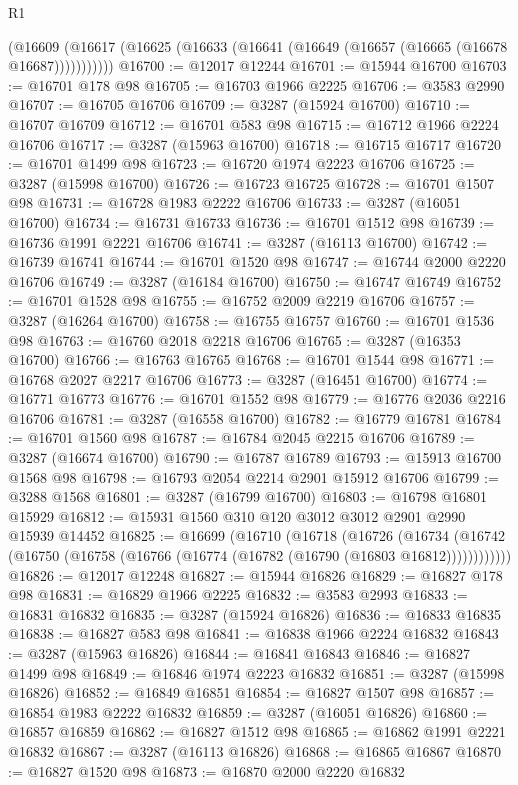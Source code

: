 \begin{lexlean}{R1}
\begin{coremodule}
        (@16609 (@16617 (@16625 (@16633 (@16641 (@16649 (@16657 (@16665 (@16678 @16687)))))))))))
@16700 := @12017 @12244
@16701 := @15944 @16700
@16703 := @16701 @178 @98
@16705 := @16703 @1966 @2225
@16706 := @3583 @2990
@16707 := @16705 @16706
@16709 := @3287 (@15924 @16700)
@16710 := @16707 @16709
@16712 := @16701 @583 @98
@16715 := @16712 @1966 @2224 @16706
@16717 := @3287 (@15963 @16700)
@16718 := @16715 @16717
@16720 := @16701 @1499 @98
@16723 := @16720 @1974 @2223 @16706
@16725 := @3287 (@15998 @16700)
@16726 := @16723 @16725
@16728 := @16701 @1507 @98
@16731 := @16728 @1983 @2222 @16706
@16733 := @3287 (@16051 @16700)
@16734 := @16731 @16733
@16736 := @16701 @1512 @98
@16739 := @16736 @1991 @2221 @16706
@16741 := @3287 (@16113 @16700)
@16742 := @16739 @16741
@16744 := @16701 @1520 @98
@16747 := @16744 @2000 @2220 @16706
@16749 := @3287 (@16184 @16700)
@16750 := @16747 @16749
@16752 := @16701 @1528 @98
@16755 := @16752 @2009 @2219 @16706
@16757 := @3287 (@16264 @16700)
@16758 := @16755 @16757
@16760 := @16701 @1536 @98
@16763 := @16760 @2018 @2218 @16706
@16765 := @3287 (@16353 @16700)
@16766 := @16763 @16765
@16768 := @16701 @1544 @98
@16771 := @16768 @2027 @2217 @16706
@16773 := @3287 (@16451 @16700)
@16774 := @16771 @16773
@16776 := @16701 @1552 @98
@16779 := @16776 @2036 @2216 @16706
@16781 := @3287 (@16558 @16700)
@16782 := @16779 @16781
@16784 := @16701 @1560 @98
@16787 := @16784 @2045 @2215 @16706
@16789 := @3287 (@16674 @16700)
@16790 := @16787 @16789
@16793 := @15913 @16700 @1568 @98
@16798 := @16793 @2054 @2214 @2901 @15912 @16706
@16799 := @3288 @1568
@16801 := @3287 (@16799 @16700)
@16803 := @16798 @16801 @15929
@16812 := @15931 @1560 @310 @120 @3012 @3012 @2901 @2990 @15939 @14452
@16825 := @16699
    (@16710
      (@16718
        (@16726
          (@16734 (@16742 (@16750 (@16758 (@16766 (@16774 (@16782 (@16790 (@16803 @16812))))))))))))
@16826 := @12017 @12248
@16827 := @15944 @16826
@16829 := @16827 @178 @98
@16831 := @16829 @1966 @2225
@16832 := @3583 @2993
@16833 := @16831 @16832
@16835 := @3287 (@15924 @16826)
@16836 := @16833 @16835
@16838 := @16827 @583 @98
@16841 := @16838 @1966 @2224 @16832
@16843 := @3287 (@15963 @16826)
@16844 := @16841 @16843
@16846 := @16827 @1499 @98
@16849 := @16846 @1974 @2223 @16832
@16851 := @3287 (@15998 @16826)
@16852 := @16849 @16851
@16854 := @16827 @1507 @98
@16857 := @16854 @1983 @2222 @16832
@16859 := @3287 (@16051 @16826)
@16860 := @16857 @16859
@16862 := @16827 @1512 @98
@16865 := @16862 @1991 @2221 @16832
@16867 := @3287 (@16113 @16826)
@16868 := @16865 @16867
@16870 := @16827 @1520 @98
@16873 := @16870 @2000 @2220 @16832

\end{coremodule}
\end{lexlean}
